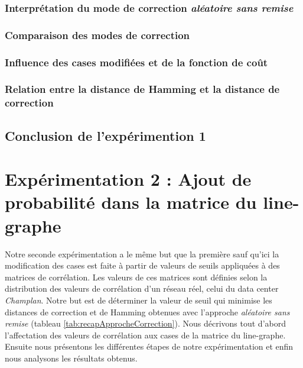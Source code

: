 		\subsubsection{Interpr\'etation du mode de correction {\em al\'eatoire sans remise}}
			\label{experimentation1InterpretationModeAleatoireSansRemise}
			
		\subsubsection{Comparaison des modes de correction}
			
		\subsubsection{Influence des cases modifi\'ees et de la fonction de co\^ut}
			\label{influenceFonctionCoutDistributionHamming1}
			
		\subsubsection{Relation entre la distance de Hamming et la distance de correction}
			
	\subsection{Conclusion de l'exp\'erimention 1}	
		

\section{Exp\'erimentation 2 : Ajout de probabilit\'e dans la matrice du line-graphe}

Notre seconde exp\'erimentation a le m\^eme but que la premi\`ere sauf qu'ici la modification des cases est faite \`a partir de valeurs de seuils appliqu\'ees \`a des matrices de corr\'elation. Les valeurs de ces matrices sont d\'efinies selon la distribution des valeurs de corr\'elation d'un r\'eseau r\'eel, celui du data center {\em Champlan}.
\newline
Notre but est de d\'eterminer la valeur de seuil qui minimise les distances de correction et de Hamming obtenues avec l'approche {\em al\'eatoire sans remise} (tableau \ref{tab:recapApprocheCorrection}). 
\newline
Nous d\'ecrivons tout d'abord l'affectation des valeurs de corr\'elation aux cases de la matrice du line-graphe. Ensuite nous pr\'esentons les diff\'erentes \'etapes de notre exp\'erimentation et enfin nous analysons les r\'esultats obtenus.
